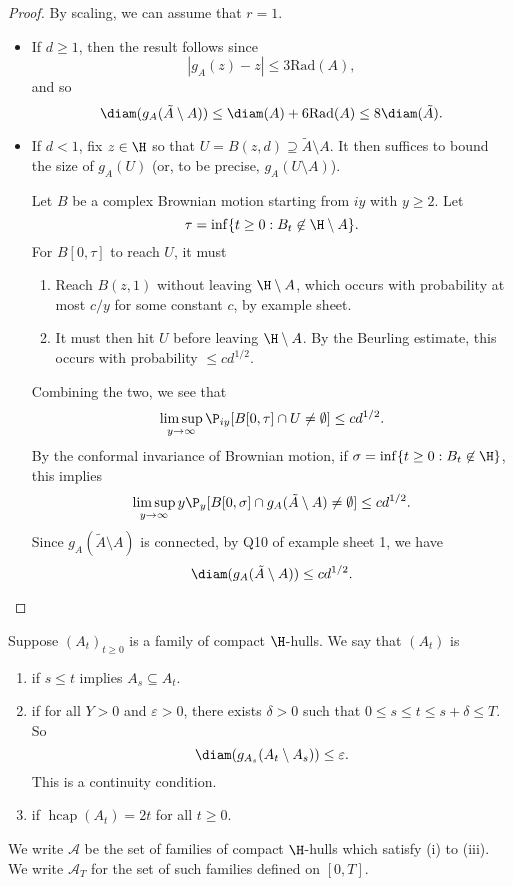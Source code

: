 \documentclass[a4paper]{article}
\DeclareMathOperator\hcap{hcap}
\newcommand\rad{\mathrm{Rad}}
\begin{document}
\begin{proof}
  By scaling, we can assume that $r = 1$.
  \begin{itemize}
    \item If $d \geq 1$, then the result follows since
      \[
        |g_A(z) - z| \leq 3 \rad(A),
      \]
      and so
      \[
        \diam(g_A(\tilde{A}\setminus A)) \leq \diam(A) + 6 \rad(A) \leq 8 \diam(\tilde{A}).
      \]
    \item If $d < 1$, fix $z \in \H$ so that $U = B(z, d) \supseteq \tilde{A} \setminus A$. It then suffices to bound the size of $g_A(U)$ (or, to be precise, $g_A(U \setminus A)$).

      Let $B$ be a complex Brownian motion starting from $iy$ with $y \geq 2$. Let
      \[
        \tau = \inf \{t \geq 0: B_t \not \in \H \setminus A\}.
      \]
      For $B[0, \tau]$ to reach $U$, it must
      \begin{enumerate}
        \item Reach $B(z, 1)$ without leaving $\H \setminus A$, which occurs with probability at most $c/y$ for some constant $c$, by example sheet.
        \item It must then hit $U$ before leaving $\H \setminus A$. By the Beurling estimate, this occurs with probability $\leq c d^{1/2}$.
      \end{enumerate}
      Combining the two, we see that
      \[
        \limsup_{y \to \infty} \P_{iy}[B[0, \tau] \cap U \not= \emptyset] \leq c d^{1/2}.
      \]
      By the conformal invariance of Brownian motion, if $\sigma = \inf \{t \geq 0 : B_t \not \in \H\}$, this implies
      \[
        \limsup_{y \to \infty} y \P_y [B[0, \sigma] \cap g_A(\tilde{A} \setminus A) \not= \emptyset] \leq c d^{1/2}.
      \]
      Since $g_A(\tilde{A} \setminus A)$ is connected, by Q10 of example sheet 1, we have
      \[
        \diam(g_A(\tilde{A} \setminus A)) \leq cd^{1/2}.\qedhere
      \]%
  \end{itemize}
\end{proof}

\begin{defi}
  Suppose $(A_t)_{t \geq 0}$ is a family of compact $\H$-hulls. We say that $(A_t)$ is
  \begin{enumerate}
    \item {} if $s \leq t$ implies $A_s \subseteq A_t$.
    \item {} if for all $Y > 0$ and $\varepsilon > 0$, there exists $\delta > 0$ such that $0 \leq s \leq t \leq s + \delta \leq T$. So
      \[
        \diam(g_{A_s}(A_t \setminus A_s)) \leq \varepsilon.
      \]
      This is a continuity condition.
    \item {} if $\hcap(A_t) = 2t$ for all $t \geq 0$.
  \end{enumerate}
  We write $\mathcal{A}$ be the set of families of compact $\H$-hulls which satisfy (i) to (iii). We write $\mathcal{A}_T$ for the set of such families defined on $[0, T]$.
\end{defi}
\end{document}
